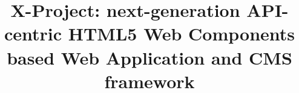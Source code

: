 \documentclass{sig-alternate}
\begin{document}
%

\title{X-Project: next-generation API-centric HTML5 Web Components based Web Application and CMS framework}

% 
%
%
%
%
\end{document}
